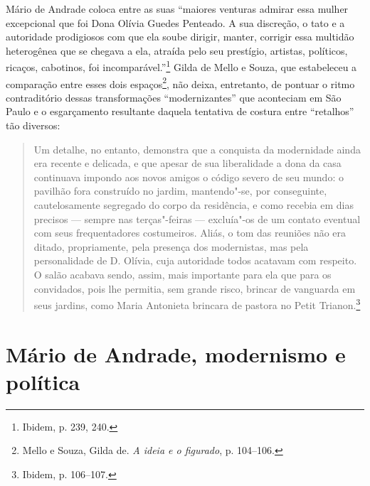 

Mário de Andrade coloca entre as suas ``maiores venturas admirar essa
mulher excepcional que foi Dona Olívia Guedes Penteado. A sua discreção,
o tato e a autoridade prodigiosos com que ela soube dirigir, manter,
corrigir essa multidão heterogênea que se chegava a ela, atraída pelo
seu prestígio, artistas, políticos, ricaços, cabotinos, foi
incomparável.''\footnote{Ibidem, p. 239, 240.} Gilda de Mello e Souza,
que estabeleceu a comparação entre esses dois espaços\footnote{Mello e
  Souza, Gilda de. \emph{A ideia e o figurado}, p. 104--106.}, não
deixa, entretanto, de pontuar o ritmo contraditório dessas
transformações ``modernizantes'' que aconteciam em São Paulo e o
esgarçamento resultante daquela tentativa de costura entre ``retalhos''
tão diversos:

\begin{quote}
Um detalhe, no entanto, demonstra que a conquista da modernidade ainda
era recente e delicada, e que apesar de sua liberalidade a dona da casa
continuava impondo aos novos amigos o código severo de seu mundo: o
pavilhão fora construído no jardim, mantendo"-se, por conseguinte,
cautelosamente segregado do corpo da residência, e como recebia em dias
precisos --- sempre nas terças"-feiras --- excluía"-os de um contato
eventual com seus frequentadores costumeiros. Aliás, o tom das reuniões
não era ditado, propriamente, pela presença dos modernistas, mas pela
personalidade de D. Olívia, cuja autoridade todos acatavam com respeito.
O salão acabava sendo, assim, mais importante para ela que para os
convidados, pois lhe permitia, sem grande risco, brincar de vanguarda em
seus jardins, como Maria Antonieta brincara de pastora no Petit
Trianon.\footnote{Ibidem, p. 106--107.}
\end{quote}

\section{Mário de Andrade, modernismo e política}

